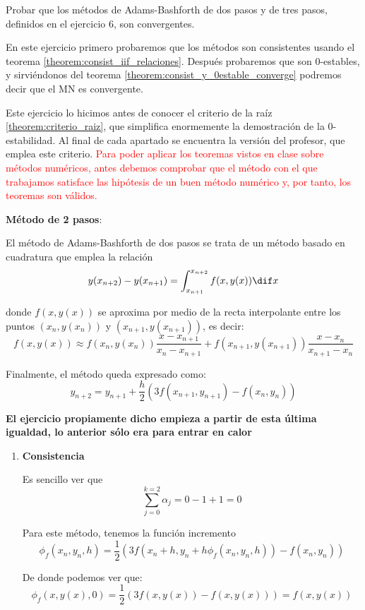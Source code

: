 \begin{problem}[8]
Probar que los métodos de Adams-Bashforth de dos pasos y de tres pasos, definidos en el ejercicio 6, son convergentes.
\solution
{}

En este ejercicio primero probaremos que los métodos son consistentes usando el teorema \ref{theorem:consist_iif_relaciones}. Después probaremos que son 0-estables, y sirviéndonos del teorema \ref{theorem:consist_y_0estable_converge} podremos decir que el MN es convergente.

Este ejercicio lo hicimos antes de conocer el criterio de la raíz \ref{theorem:criterio_raiz}, que simplifica enormemente la demostración de la 0-estabilidad. Al final de cada apartado se encuentra la versión del profesor, que emplea este criterio.
\textcolor{red}{
\obs Para poder aplicar los teoremas vistos en clase sobre métodos numéricos, antes debemos comprobar que el método con el que trabajamos satisface las hipótesis de un buen método numérico y, por tanto, los teoremas son válidos.}

\spart \textbf{Método de 2 pasos}:

El método de Adams-Bashforth de dos pasos se trata de un método basado en cuadratura que emplea la relación
\[y(x_{n+2}) - y(x_{n+1}) = \int_{x_{n+1}}^{x_{n+2}} f(x,y(x)) \dif x\]

donde $f(x,y(x))$ se aproxima por medio de la recta interpolante entre los puntos $(x_n,y(x_n))$ y $(x_{n+1},y(x_{n+1}))$, es decir:
\[f(x,y(x)) \approx f(x_n, y(x_n)) \frac{x-x_{n+1}}{x_n-x_{n+1}}+f(x_{n+1},y(x_{n+1}))\frac{x-x_n}{x_{n+1}-x_n}\]

Finalmente, el método queda expresado como:
\[y_{n+2} = y_{n+1}+\frac{h}{2}\left( 3f(x_{n+1},y_{n+1})-f(x_n,y_n)\right)\]

\textbf{El ejercicio propiamente dicho empieza a partir de esta última igualdad, lo anterior sólo era para entrar en calor}

\begin{enumerate}
\item \textbf{Consistencia}

Es sencillo ver que \[\sum_{j=0}^{k=2} α_j = 0 - 1 + 1 = 0\]

Para este método, tenemos la función incremento
\[\phi_f(x_n,y_n,h) = \frac{1}{2}\left(3f(x_n+h,y_n+h\phi_f(x_n,y_n,h))-f(x_n,y_n)\right)\]

De donde podemos ver que:
\[\phi_f(x,y(x),0) = \frac{1}{2} \left(3f(x,y(x)) - f(x,y(x)) \right) = f(x,y(x))\]


\end{enumerate}
\end{problem}
